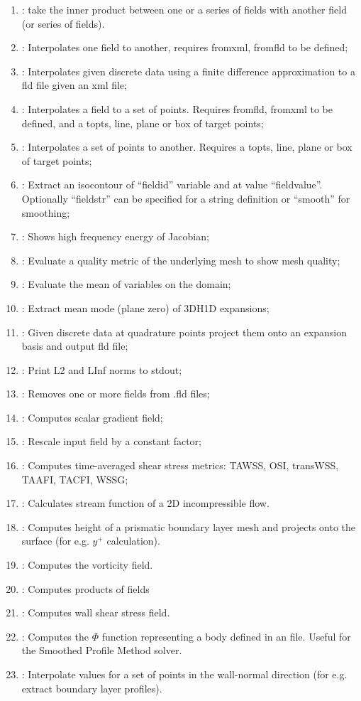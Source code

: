 \begin{enumerate}
\item {}: take the inner product between one or a series of fields with another field (or series of fields).
\item {}: Interpolates one field to another, requires fromxml, fromfld to be defined;
\item {}: Interpolates given discrete data using a finite difference approximation to a fld file given an xml file;
\item {}: Interpolates a field to a set of points. Requires fromfld, fromxml to be defined, and a topts, line, plane or box of target points;
\item {}: Interpolates a set of points to another. Requires a topts, line, plane or box of target points;
\item {}: Extract an isocontour of ``fieldid'' variable and at value ``fieldvalue''. Optionally ``fieldstr'' can be specified for a string definition or ``smooth'' for smoothing;
\item {}: Shows high frequency energy of Jacobian;
\item {}: Evaluate a quality metric of the underlying mesh to show mesh quality;
\item {}: Evaluate the mean of variables on the domain;
\item {}: Extract mean mode (plane zero) of 3DH1D expansions;
\item {}: Given discrete data at quadrature points
  project them onto an expansion basis and output fld file;
\item {}: Print L2 and LInf norms to stdout;
\item {}: Removes one or more fields from .fld files;
\item {}: Computes scalar gradient field;
\item {}: Rescale input field by a constant factor;
\item {}: Computes time-averaged shear stress metrics: TAWSS, OSI, transWSS, TAAFI, TACFI, WSSG;
\item {}: Calculates stream function of a 2D incompressible flow.
\item {}: Computes height of a prismatic boundary layer mesh and projects onto the surface (for e.g. $y^+$ calculation).
\item {}: Computes the vorticity field.
\item {}: Computes products of fields
\item {}: Computes wall shear stress field.
\item {}: Computes the $\Phi$ function representing a body defined
  in an  file. Useful for the Smoothed Profile Method solver.
\item {}: Interpolate values for a set of points in the wall-normal direction (for e.g. extract boundary layer profiles).
\end{enumerate}
